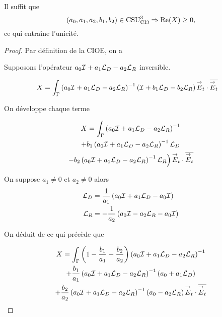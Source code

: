   
  \begin{prop}
    \label{prop:csu:ci3-3}
    Il suffit que
    \begin{equation*}
      (a_0,a_1,a_2,b_1,b_2) \in \CSU[3]{CI3} \Rightarrow \Re(X) \ge 0,
    \end{equation*}
    ce qui entraîne l'unicité.
  \end{prop}

  \begin{proof}
    Par définition de la CIOE, on a

    Supposons l'opérateur \(a_0\oI + a_1 \LD - a_2 \LR\) inversible.

    \begin{align*}
      X &= \int_\Gamma \left(a_0\oI + a_1 \LD - a_2 \LR \right)^{-1}\left( \oI + b_1 \LD - b_2 \LR \right) \vE_t\cdot \conj{\vE_t}
    \end{align*}

    On développe chaque terme

    \begin{multline*}
      X = \int_\Gamma \left(a_0\oI + a_1 \LD - a_2 \LR \right)^{-1}
      \\
      + b_1 \left(a_0\oI + a_1 \LD - a_2 \LR \right)^{-1}\LD
      \\
      \left.
      - b_2 \left(a_0\oI + a_1 \LD - a_2 \LR \right)^{-1}\LR \right) \vE_t\cdot \conj{\vE_t}
    \end{multline*}

    On suppose \(a_1\not=0\) et \(a_2\not=0\) alors
    \begin{align*}
      \LD & = \frac{1}{a_1}\left(a_0\oI + a_1 \LD - a_0\oI\right)
      \\
      \LR & = -\frac{1}{a_2}\left(a_0\oI - a_2 \LR - a_0\oI\right)
    \end{align*}


    On déduit de ce qui précède que

    \begin{multline*}
      X = \int_\Gamma \left(1-\frac{b_1}{a_1} -\frac{b_2}{a_2}\right)\left(a_0\oI + a_1 \LD - a_2 \LR \right)^{-1}
      \\
      + \frac{b_1}{a_1} \left(a_0\oI + a_1 \LD - a_2 \LR \right)^{-1}\left(a_0+a_1\LD\right)
      \\
      + \frac{b_2}{a_2} \left(a_0\oI + a_1 \LD - a_2 \LR \right)^{-1}\left(a_0-a_2\LR\right) \vE_t\cdot \conj{\vE_t}
    \end{multline*}


\end{proof}
